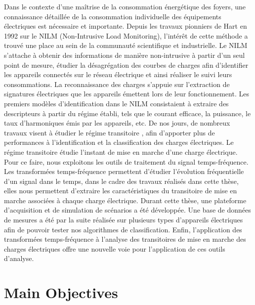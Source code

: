 \documentclass[a0,portrait]{a0poster}
\begin{document}
\begin{multicols}{2}
Dans le contexte d'une maîtrise de la consommation énergétique des foyers, une connaissance détaillée de la consommation individuelle des équipements électriques est nécessaire et importante. Depuis les travaux pionniers de Hart en 1992 \cite{hart1992} sur le NILM (Non-Intrusive Load Monitoring), l'intérêt de cette méthode a trouvé une place au sein de la communauté scientifique et industrielle. Le NILM s’attache à obtenir des informations de manière non-intrusive à partir d'un seul point de mesure, étudier la désagrégation des courbes de charges afin d'identifier les appareils connectés sur le réseau électrique et ainsi réaliser le suivi leurs consommations. La reconnaissance des charges s’appuie sur l’extraction de signatures électriques que les appareils émettent lors de leur fonctionnement. Les premiers modèles d’identification dans le NILM consistaient à extraire des descripteurs à partir du régime établi, tels que le courant efficace, la puissance, le taux d’harmoniques émis par les appareils, etc. De nos jours, de nombreux travaux visent à étudier le régime transitoire \cite{naitmeziane2016, sanquer2013}, afin d'apporter plus de performances à l'identification et la classification des charges électriques. Le régime transitoire étudie l'instant de mise en marche d'une charge électrique. Pour ce faire, nous exploitons les outils de traitement du signal temps-fréquence. Les transformées temps-fréquence permettent d'étudier l'évolution fréquentielle d'un signal dans le temps, dans le cadre des travaux réalisés dans cette thèse, elles nous permettent d'extraire les caractéristiques du transitoire de mise en marche associées à chaque charge électrique. Durant cette thèse, une plateforme d'acquisition et de simulation de scénarios a été développée. Une base de données de mesures a été par la suite réalisée sur plusieurs types d'appareils électriques afin de pouvoir tester nos algorithmes de classification. Enfin, l'application des transformées temps-fréquence à l'analyse des transitoires de mise en marche des charges électriques offre une nouvelle voie pour l'application de ces outils d'analyse.


\color{DarkSlateGray} %

\section*{Main Objectives}


\end{multicols}
\end{document}
